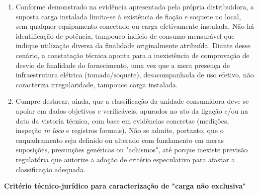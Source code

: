 \begin{enumerate}[resume]
    \item Conforme demonstrado na evidência apresentada pela própria distribuidora, a suposta carga instalada limita-se à existência de fiação e soquete no local, sem qualquer equipamento conectado ou carga efetivamente instalada. Não há identificação de potência, tampouco indício de consumo mensurável que indique utilização diversa da finalidade originalmente atribuída. Diante desse cenário, a constatação técnica aponta para a inexistência de comprovação de desvio de finalidade do fornecimento, uma vez que a mera presença de infraestrutura elétrica (tomada/soquete), desacompanhada de uso efetivo, não caracteriza irregularidade, tampouco carga instalada.

    \item Cumpre destacar, ainda, que a classificação da unidade consumidora deve se apoiar em dados objetivos e verificáveis, apurados no ato da ligação e/ou na data da vistoria técnica, com base em evidências concretas (medições, inspeção \textit{in loco} e registros formais). Não se admite, portanto, que o enquadramento seja definido ou alterado com fundamento em meras suposições, presunções genéricas ou "achismos", até porque inexiste previsão regulatória que autorize a adoção de critério especulativo para afastar a classificação adequada.
\end{enumerate}

\textbf{Critério técnico-jurídico para caracterização de "carga não exclusiva"}


